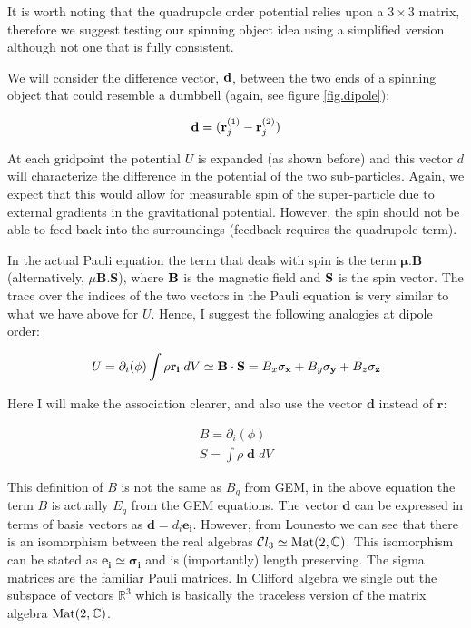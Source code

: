 It is worth noting that the quadrupole order potential relies upon a $3 \times 3$ matrix, therefore we suggest testing our spinning object idea using a simplified version although not one that is fully consistent.

We will consider the difference vector, ${\bf d}$, between the two ends of a spinning object that could resemble a dumbbell (again, see figure \ref{fig.dipole}):

\begin{equation}
{\bf d} = ({\bf r}^{(1)}_j - {\bf r}^{(2)}_j)
\end{equation}

\noindent At each gridpoint the potential $U$ is expanded (as shown before) and this vector $d$ will characterize the difference in the potential of the two sub-particles. Again, we expect that this would allow for measurable spin of the super-particle due to external gradients in the gravitational potential. However, the spin should not be able to feed back into the surroundings (feedback requires the quadrupole term).

In the actual Pauli equation the term that deals with spin is the term $\mathbf{\mu}.\mathbf{B}$ (alternatively, $\mu \mathbf{B}.\mathbf{S}$), where ${\bf B}$ is the magnetic field and ${\bf S}$ is the spin vector. The trace over the indices of the two vectors in the Pauli equation is very similar to what we have above for $U$. Hence, I suggest the following analogies at dipole order:

\begin{equation}
U = \partial_i(\phi) \int \rho {\bf r_i}\;dV \simeq {\bf B\cdot S} = B_x\mathbf{\sigma_x} + B_y\mathbf{\sigma_y} + B_z\mathbf{\sigma_z}
\end{equation}

\noindent Here I will make the association clearer, and also use the vector $\mathbf{d}$ instead of $\mathbf{r}$:

\begin{eqnarray}
B = \partial_i(\phi) \\
S = \int \rho \;\mathbf{d}\;dV
\end{eqnarray}

\noindent This definition of $B$ is not the same as $B_g$ from GEM, in the above equation the term $B$ is actually $E_g$ from the GEM equations. The vector $\mathbf{d}$ can be expressed in terms of basis vectors as $\mathbf{d} = d_i \mathbf{e_i}$. However, from Lounesto \citep{bib_lou} we can see that there is an isomorphism between the real algebras $\mathcal{C}l_3 \simeq {\rm Mat}(2, {\mathbb C})$. This isomorphism can be stated as $\mathbf{e_i} \simeq \mathbf{\sigma_i}$ and is (importantly) length preserving. The sigma matrices are the familiar Pauli matrices. In Clifford algebra we single out the subspace of vectors ${\mathbb R}^3$ which is basically the traceless version of the matrix algebra ${\rm Mat}(2, {\mathbb C})$.

